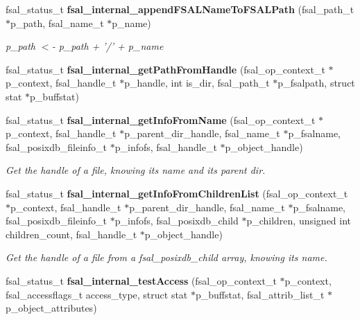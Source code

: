 \begin{CompactItemize}
\item 
fsal\_\-status\_\-t {\bf fsal\_\-internal\_\-append\-FSALName\-To\-FSALPath} (fsal\_\-path\_\-t $\ast$p\_\-path, fsal\_\-name\_\-t $\ast$p\_\-name)
\begin{CompactList}\small\item\em p\_\-path $<$- p\_\-path + '/' + p\_\-name \item\end{CompactList}\item 
fsal\_\-status\_\-t {\bf fsal\_\-internal\_\-get\-Path\-From\-Handle} (fsal\_\-op\_\-context\_\-t $\ast$p\_\-context, fsal\_\-handle\_\-t $\ast$p\_\-handle, int is\_\-dir, fsal\_\-path\_\-t $\ast$p\_\-fsalpath, struct stat $\ast$p\_\-buffstat)
\item 
fsal\_\-status\_\-t {\bf fsal\_\-internal\_\-get\-Info\-From\-Name} (fsal\_\-op\_\-context\_\-t $\ast$p\_\-context, fsal\_\-handle\_\-t $\ast$p\_\-parent\_\-dir\_\-handle, fsal\_\-name\_\-t $\ast$p\_\-fsalname, fsal\_\-posixdb\_\-fileinfo\_\-t $\ast$p\_\-infofs, fsal\_\-handle\_\-t $\ast$p\_\-object\_\-handle)
\begin{CompactList}\small\item\em Get the handle of a file, knowing its name and its parent dir. \item\end{CompactList}\item 
fsal\_\-status\_\-t {\bf fsal\_\-internal\_\-get\-Info\-From\-Children\-List} (fsal\_\-op\_\-context\_\-t $\ast$p\_\-context, fsal\_\-handle\_\-t $\ast$p\_\-parent\_\-dir\_\-handle, fsal\_\-name\_\-t $\ast$p\_\-fsalname, fsal\_\-posixdb\_\-fileinfo\_\-t $\ast$p\_\-infofs, fsal\_\-posixdb\_\-child $\ast$p\_\-children, unsigned int children\_\-count, fsal\_\-handle\_\-t $\ast$p\_\-object\_\-handle)
\begin{CompactList}\small\item\em Get the handle of a file from a fsal\_\-posixdb\_\-child array, knowing its name. \item\end{CompactList}\item 
fsal\_\-status\_\-t {\bf fsal\_\-internal\_\-test\-Access} (fsal\_\-op\_\-context\_\-t $\ast$p\_\-context, fsal\_\-accessflags\_\-t access\_\-type, struct stat $\ast$p\_\-buffstat, fsal\_\-attrib\_\-list\_\-t $\ast$p\_\-object\_\-attributes)\label{fsal__internal_8c_a26}

\end{CompactItemize}
